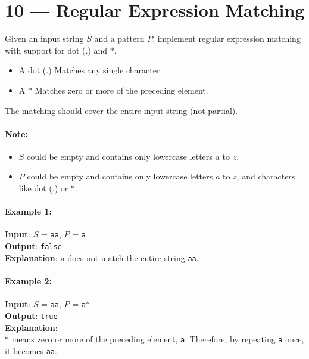 \section{10 --- Regular Expression Matching}
Given an input string $S$ and a pattern $P$, implement regular expression matching with support for dot (.) and $\ast$.
\begin{itemize}
\item A dot (.) Matches any single character.
\item A $\ast$ Matches zero or more of the preceding element.
\end{itemize}
The matching should cover the entire input string (not partial).

\paragraph{Note:}

\begin{itemize}
\item $S$ could be empty and contains only lowercase letters $a$ to $z$.
\item $P$ could be empty and contains only lowercase letters $a$ to $z$, and characters like dot (.) or $\ast$.
\end{itemize}

\paragraph{Example 1:}
\begin{flushleft}

\textbf{Input}: $S$ = \texttt{aa}, $P$ = \texttt{a}
\\
\textbf{Output}: \texttt{false}
\\
\textbf{Explanation}: $\texttt{a}$ does not match the entire string \texttt{aa}.
\end{flushleft}

\paragraph{Example 2:}

\begin{flushleft}
\textbf{Input}: $S$ = \texttt{aa}, $P$ = \texttt{a}$\ast$
\\
\textbf{Output}: \texttt{true}
\\
\textbf{Explanation}: 
\\
$\ast$ means zero or more of the preceding element, \texttt{a}. Therefore, by repeating \texttt{a} once, it becomes \texttt{aa}.
\end{flushleft}

